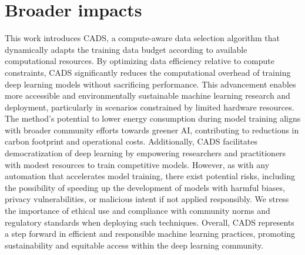 \section{Broader impacts}
\label{appendix:impacts}
This work introduces CADS, a compute-aware data selection algorithm that dynamically adapts the training data budget according to available computational resources. By optimizing data efficiency relative to compute constraints, CADS significantly reduces the computational overhead of training deep learning models without sacrificing performance. This advancement enables more accessible and environmentally sustainable machine learning research and deployment, particularly in scenarios constrained by limited hardware resources.
The method’s potential to lower energy consumption during model training aligns with broader community efforts towards greener AI, contributing to reductions in carbon footprint and operational costs. Additionally, CADS facilitates democratization of deep learning by empowering researchers and practitioners with modest resources to train competitive models.
However, as with any automation that accelerates model training, there exist potential risks, including the possibility of speeding up the development of models with harmful biases, privacy vulnerabilities, or malicious intent if not applied responsibly. We stress the importance of ethical use and compliance with community norms and regulatory standards when deploying such techniques.
Overall, CADS represents a step forward in efficient and responsible machine learning practices, promoting sustainability and equitable access within the deep learning community.
